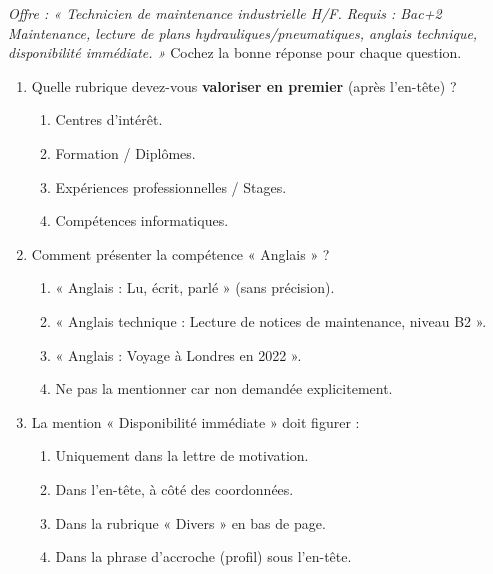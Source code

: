 \documentclass[11pt]{article}
\begin{document}
\begin{exercice}
\textit{Offre : « Technicien de maintenance industrielle H/F. Requis : Bac+2 Maintenance, lecture de plans hydrauliques/pneumatiques, anglais technique, disponibilité immédiate. »}
Cochez la bonne réponse pour chaque question.
\begin{enumerate}
    \item Quelle rubrique devez-vous \textbf{valoriser en premier} (après l'en-tête) ?
    \begin{enumerate}
        \item Centres d'intérêt.
        \item Formation / Diplômes.
        \item Expériences professionnelles / Stages.
        \item Compétences informatiques.
    \end{enumerate}
    \item Comment présenter la compétence « Anglais » ?
    \begin{enumerate}
        \item « Anglais : Lu, écrit, parlé » (sans précision).
        \item « Anglais technique : Lecture de notices de maintenance, niveau B2 ».
        \item « Anglais : Voyage à Londres en 2022 ».
        \item Ne pas la mentionner car non demandée explicitement.
    \end{enumerate}
    \item La mention « Disponibilité immédiate » doit figurer :
    \begin{enumerate}
        \item Uniquement dans la lettre de motivation.
        \item Dans l'en-tête, à côté des coordonnées.
        \item Dans la rubrique « Divers » en bas de page.
        \item Dans la phrase d'accroche (profil) sous l'en-tête.
    \end{enumerate}
\end{enumerate}
\end{exercice}
\end{document}
